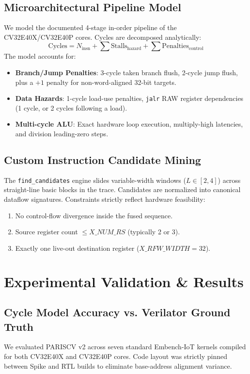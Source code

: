 \documentclass[conference]{IEEEtran}
\begin{document}
\subsection{Microarchitectural Pipeline Model}
We model the documented 4-stage in-order pipeline of the CV32E40X/CV32E40P cores. Cycles are decomposed analytically:
\begin{equation}
\text{Cycles} = N_{\text{insn}} + \sum \text{Stalls}_{\text{hazard}} + \sum \text{Penalties}_{\text{control}}
\end{equation}
The model accounts for:
\begin{itemize}
    \item \textbf{Branch/Jump Penalties}: 3-cycle taken branch flush, 2-cycle jump flush, plus a $+1$ penalty for non-word-aligned 32-bit targets.
    \item \textbf{Data Hazards}: 1-cycle load-use penalties, \texttt{jalr} RAW register dependencies (1 cycle, or 2 cycles following a load).
    \item \textbf{Multi-cycle ALU}: Exact hardware loop execution, multiply-high latencies, and division leading-zero steps.
\end{itemize}

\subsection{Custom Instruction Candidate Mining}
The \texttt{find\_candidates} engine slides variable-width windows ($L \in [2, 4]$) across straight-line basic blocks in the trace. Candidates are normalized into canonical dataflow signatures. Constraints strictly reflect hardware feasibility:
\begin{enumerate}
    \item No control-flow divergence inside the fused sequence.
    \item Source register count $\le X\_NUM\_RS$ (typically 2 or 3).
    \item Exactly one live-out destination register ($X\_RFW\_WIDTH = 32$).
\end{enumerate}

\section{Experimental Validation \& Results}

\subsection{Cycle Model Accuracy vs. Verilator Ground Truth}
We evaluated PARISCV v2 across seven standard Embench-IoT kernels compiled for both CV32E40X and CV32E40P cores. Code layout was strictly pinned between Spike and RTL builds to eliminate base-address alignment variance.
\end{document}
